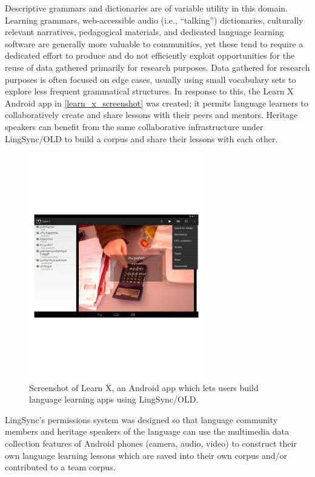 \documentclass[11pt]{article}
\begin{document}
Descriptive grammars and dictionaries are of variable utility in this domain.
Learning grammars, web-accessible audio (i.e., ``talking'') dictionaries,
culturally relevant narratives, pedagogical materials, and dedicated language
learning software are generally more valuable to communities, yet these tend to
require a dedicated effort to produce and do not efficiently exploit
opportunities for the reuse of data gathered primarily for research purposes. 
Data gathered for research purposes is often focused on edge cases, usually
using small vocabulary sets to explore less frequent grammatical structures.
In response to this, the Learn X Android app in \autoref{learn_x_screenshot}
was created; it permits language learners to collaboratively create and share
lessons with their peers and mentors. Heritage speakers can benefit from the
same collaborative infrastructure under LingSync/OLD to build a corpus and share
their lessons with each other. 



\begin{figure}
\begin{center}
\includegraphics[width=3in]{images/learnX}
\caption{Screenshot of Learn X, an Android app which lets users build language
learning apps using LingSync/OLD.}
\label{learn_x_screenshot}
\end{center}
\end{figure}



LingSync's permissions system was designed so that language community members
and heritage speakers of the language can use the multimedia data collection
features of Android phones (camera, audio, video) to construct their own
language learning lessons which are saved into their own corpus and/or
contributed to a team corpus.
\end{document}
